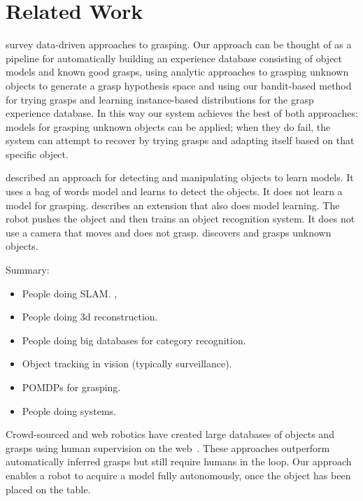 \documentclass[graybox]{svmult}
\begin{document}
\section{Related Work}

\label{sec:relatedwork}

\citet{bohg13} survey data-driven approaches to grasping.  Our
approach can be thought of as a pipeline for automatically building an
experience database consisting of object models and known good grasps,
using analytic approaches to grasping unknown objects to generate a
grasp hypothesis space and using our bandit-based method for trying
grasps and learning instance-based distributions for the grasp
experience database.  In this way our system achieves the best of both
approaches: models for grasping unknown objects can be applied; when
they do fail, the system can attempt to recover by trying grasps and
adapting itself based on that specific object.  

\citet{ude12} described an approach for detecting and manipulating
objects to learn models.  It uses a bag of words model and learns to
detect the objects.  It does not learn a model for grasping.
\citet{schiebener13} describes an extension that also does model
learning.  The robot pushes the object and then trains an object
recognition system.  It does not use a camera that moves and does not
grasp.
\citet{schiebener12} discovers and grasps unknown objects.

Summary: 
\begin{itemize}
\item People doing SLAM.  \citet{wang07, gallagher09}, 
\item People doing 3d reconstruction.   \citet{krainin11, banta00}
\item People doing big databases for category recognition.  \citet{kent14a, kent14, lai11a, goldfeder09}
\item Object tracking in vision (typically surveillance).
\item POMDPs for grasping.  \citet{platt11, hsiao10}
\item People doing systems.  \citet{hudson12, ciocarlie14}
\end{itemize}




Crowd-sourced and web robotics have created large databases of objects
and grasps using human supervision on the web~\citep{kent14a, kent14}.
These approaches outperform automatically inferred grasps but still
require humans in the loop.  Our approach enables a robot to acquire a
model fully autonomously, once the object has been placed on the
table.
\end{document}

